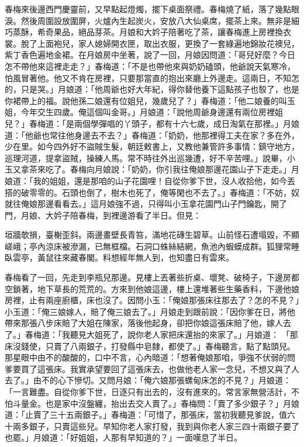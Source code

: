\begin{showcontents}{}
春梅來後邊西門慶靈前，又早點起燈燭，擺下桌面祭禮。春梅燒了紙，落了幾點眼淚。然後周圍設放圍屏，火爐內生起炭火，安放八大仙桌席，擺茶上來。無非是細巧蒸酥，希奇果品，絕品芽茶。月娘和大妗子陪著吃了茶，讓春梅進上房裡換衣裳。脫了上面袍兒，家人媳婦開衣匣，取出衣服，更換了一套綠遍地錦妝花襖兒，紫丁香色遍地金裙。在月娘房中坐著，說了一回，月娘因問道：「哥兒好麼？今日怎不帶他來這裡走走？」春梅道：「不是也帶他來與奶奶磕頭，他爺說天氣寒冷，怕風冒著他。他又不肯在房裡，只要那當直的抱出來廳上外邊走。這兩日，不知怎的，只是哭。」月娘道：「他周爺也好大年紀，得你替他養下這點孩子也彀了，也是你裙帶上的福。說他孫二娘還有位姐兒，幾歲兒了？」春梅道：「他二娘養的叫玉姐，今年交生四歲。俺這個叫金哥。」月娘道：「說他周爺身邊還有兩位房裡姐兒？」春梅道：「是兩個學彈唱的丫頭子，都有十六七歲，成日淘氣在那裡。」月娘道：「他爺也常往他身邊去不去？」春梅道：「奶奶，他那裡得工夫在家？多在外，少在里。如今四外好不盜賊生髮，朝廷敕書上，又教他兼管許多事情：鎮守地方，巡理河道，提拿盜賊，操練人馬。常不時往外出巡幾遭，好不辛苦哩。」說畢，小玉又拿茶來吃了。春梅向月娘說：「奶奶，你引我往俺娘那邊花園山子下走走。」月娘道：「我的姐姐，還是那咱的山子花園哩！自從你爹下世，沒人收拾他，如今丟搭的破零零的。石頭也倒了，樹木也死了，俺等閑也不去了。」春梅道：「不妨，奴就往俺娘那邊看看去。」這月娘強不過，只得叫小玉拿花園門山子門鑰匙，開了門，月娘、大妗子陪春梅，到裡邊游看了半日。但見：

垣牆欹損，臺榭歪斜。兩邊畫壁長青笞，滿地花磚生碧草。山前怪石遭塌毀，不顯嵯峨；亭內涼床被滲漏，已無框檔。石洞口蛛絲結網，魚池內蝦蟆成群。狐狸常睡臥雲亭，黃鼠往來藏春閣。料想經年無人到，也知盡日有雲來。

春梅看了一回，先走到李瓶兒那邊。見樓上丟著些折桌、壞凳、破椅子，下邊房都空鎖著，地下草長的荒荒的。方來到他娘這邊，樓上還堆著些生藥香料，下邊他娘房裡，止有兩座廚櫃，床也沒了。因問小玉：「俺娘那張床往那去了？怎的不見？」小玉道：「俺三娘嫁人，賠了俺三娘去了。」月娘走到跟前說：「因你爹在日，將他帶來那張八步床賠了大姐在陳家，落後他起身，卻把你娘這張床賠了他，嫁人去了。」春梅道：「我聽見大姐死了，說你老人家把床還抬的來家了。」月娘道： 「那床沒錢使，只賣了八兩銀子，打發縣中皂隸，都使了。」春梅聽言，點了點頭兒。那星眼中由不的酸酸的，口中不言，心內暗道：「想著俺娘那咱，爭強不伏弱的問爹要買了這張床。我實承望要回了這張床去，也做他老人家一念兒，不想又與了人去了。」由不的心下慘切。又問月娘：「俺六娘那張螺甸床怎的不見？」月娘道：「一言難盡。自從你爹下世，日逐只有出去的，沒有進來的。常言家無營活計，不怕斗量金。也是家中沒盤纏，抬出去交人賣了。」春梅問：「賣了多少銀子？」月娘道：「止賣了三十五兩銀子。」春梅道：「可惜了，那張床，當初我聽見爹說，值六十兩多銀子，只賣這些兒。早知你老人家打發，我到與你老人家三四十兩銀子要了也罷。」月娘道：「好姐姐，人那有早知道的？」一面嘆息了半日。


\end{showcontents}

